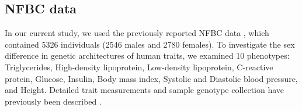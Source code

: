 \documentclass[11pt]{article}
\begin{document}
\subsection{NFBC data}

In our current study, we used the previously reported NFBC data \citep{Sabatti:NatGenet:2009},
which contained 5326 individuals (2546 males and 2780 females).
To investigate the sex difference 
in genetic architectures of human traits, 
we examined 10 phenotypes:
Triglycerides, High-density lipoprotein, Low-density lipoprotein, C-reactive protein,
Glucose, Insulin, Body mass index, Systolic and Diastolic blood pressure, and Height. 
Detailed trait measurements and sample genotype collection have previously been described \citep{Sabatti:NatGenet:2009}.






\end{document}
